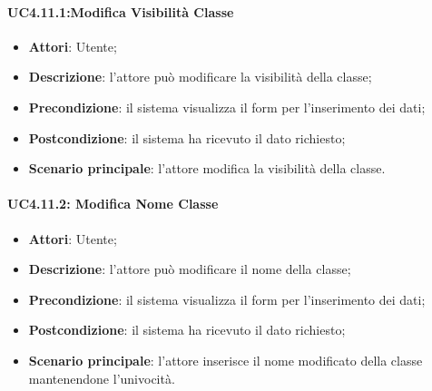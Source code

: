 \paragraph{UC4.11.1:Modifica Visibilità Classe}
\label{UC4.11.1} %
\begin{itemize}
	\item \textbf{Attori}: Utente;
	\item \textbf{Descrizione}: l'attore può modificare la visibilità della classe;
	\item \textbf{Precondizione}: il sistema visualizza il form per l'inserimento dei dati;
	\item \textbf{Postcondizione}: il sistema ha ricevuto il dato richiesto;
	\item \textbf{Scenario principale}: l'attore modifica la visibilità della classe.
\end{itemize}

\paragraph{UC4.11.2: Modifica Nome Classe}
\label{UC4.11.2}
\begin{itemize}
	\item \textbf{Attori}: Utente;
	\item \textbf{Descrizione}: l'attore può modificare il nome della classe;
	\item \textbf{Precondizione}: il sistema visualizza il form per l'inserimento dei dati;
	\item \textbf{Postcondizione}: il sistema ha ricevuto il dato richiesto;
	\item \textbf{Scenario principale}:	l'attore inserisce il nome modificato della classe mantenendone l'univocità.
\end{itemize}

